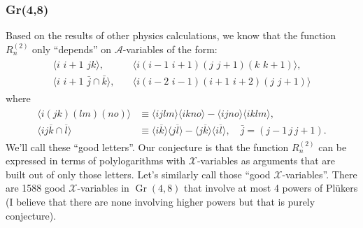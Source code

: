 \documentclass[12pt]{article}
\DeclareMathOperator{\Gr}{Gr}
\def\a{\mathcal{A}}
\def\x{\mathcal{X}}
\def\ket#1{\langle #1 \rangle}
\begin{document}
\subsubsection*{Gr(4,8)}
Based on the results of other physics calculations, we know that the function $R^{(2)}_n$ only ``depends'' on $\a$-variables of the form: 
\begin{align}\label{def:letters}
\begin{split}
\ket{i\,\,i{+}1\,\,jk},& \quad 
\ket{i(i{-}1\,\,i{+}1)(j\,\,j{+}1)(k\,\,k{+}1)}, \\ 
\ket{i\,\,i{+}1\,\,\bar{j}\cap\bar{k}},& \quad
\ket{i(i{-}2\,\,i{-}1)(i{+}1\,\,i{+}2)(j\,\,j{+}1)}
\end{split}
\end{align}
where
\begin{align}
\begin{split}
	\ket{i(jk)(lm)(no)} &\equiv \ket{ijlm}\ket{ikno} - \ket{ijno} \ket{iklm},\\
	\ket{ij\overline{k} \cap \overline{l}} &\equiv \ket{i\overline{k}}\ket{j\overline{l}} - \ket{j\overline{k}}\ket{i\overline{l}},\quad \bar{j}=(j-1\,j\,j+1).
\end{split}
\end{align} 
We'll call these ``good letters''. Our conjecture is that the function $R^{(2)}_n$ can be expressed in terms of polylogarithms with $\x$-variables as arguments that are built out of only those letters. Let's similarly call those ``good $\x$-variables''. There are 1588 good $\x$-variables in $\Gr(4,8)$ that involve at most 4 powers of Pl\"ukers (I believe that there are none involving higher powers but that is purely conjecture). 
\end{document}

